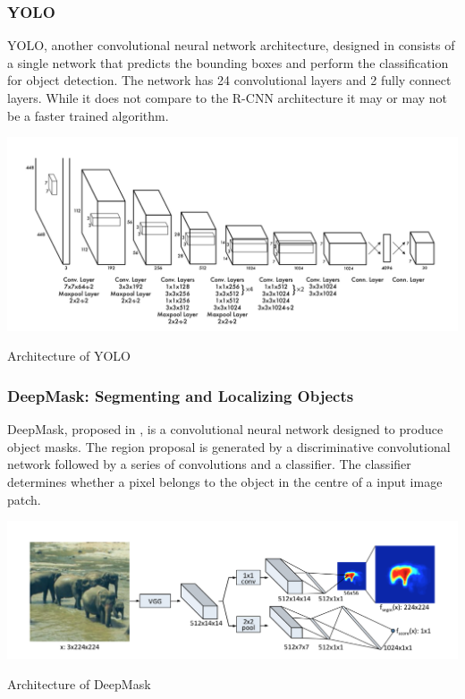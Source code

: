 \subsubsection{YOLO}
YOLO, another convolutional neural network architecture, designed in \cite{DBLP:journals/corr/RedmonDGF15} consists of a single network that predicts the bounding boxes and perform the classification for object detection. 
The network has 24 convolutional layers and 2 fully connect layers.  
While it does not compare to the R-CNN architecture it may or may not be a faster trained algorithm.

\begin{table}[!ht]
  \includegraphics[width=\textwidth]{lectures/04-b/yolo.png}
  \caption{Architecture of YOLO}
  \label{fig:yolo}
\end{table}


\subsubsection{DeepMask: Segmenting and Localizing Objects}
DeepMask, proposed in \cite{DBLP:journals/corr/PinheiroCD15}, is a convolutional neural network designed to produce object masks.
The region proposal is generated by a discriminative convolutional network followed by a series of convolutions and a classifier.
The classifier determines whether a pixel belongs to the object in the centre of a input image patch.

\begin{table}[!ht]
  \includegraphics[width=\textwidth]{lectures/04-b/deepmsk.png}
  \caption{Architecture of DeepMask}
  \label{fig:deepmsk}
\end{table}


